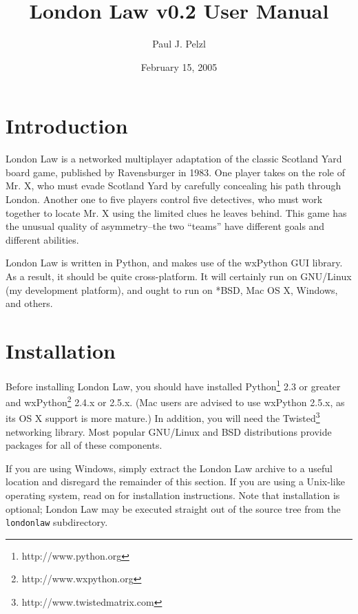 \documentclass[11pt,notitlepage]{article}
\begin{document}
\title{London Law v0.2 User Manual}
\author{Paul J. Pelzl}
\date{February 15, 2005}
\maketitle

\section*{Introduction}
London Law is a networked multiplayer adaptation of the classic Scotland Yard
board game, published by Ravensburger in 1983.  One player takes on the
role of Mr. X, who must evade Scotland Yard by carefully concealing his
path through London.  Another one to five players control five detectives,
who must work together to locate Mr. X using the limited clues he leaves
behind.  This game has the unusual quality of asymmetry--the two ``teams''
have different goals and different abilities.

London Law is written in Python, and makes use of the wxPython GUI library.
As a result, it should be quite cross-platform.  It will certainly run on
GNU/Linux (my development platform), and ought to run on *BSD, Mac OS X,
Windows, and others.

\section*{Installation}
Before installing London Law, you should have installed 
Python\footnote{http://www.python.org}
2.3 or greater and 
wxPython\footnote{http://www.wxpython.org}
2.4.x or 2.5.x.  (Mac users are advised to use wxPython 2.5.x, as its OS X support
is more mature.)  In addition, you will need the
Twisted\footnote{http://www.twistedmatrix.com}
networking library.  Most popular GNU/Linux and BSD distributions provide packages
for all of these components.

If you are using Windows, simply extract the London Law archive to a useful
location and disregard the remainder of this section.  If you are using a
Unix-like operating system, read on for installation instructions.  Note that
installation is optional; London Law may be executed straight out of the source tree from
the {\tt londonlaw} subdirectory.
\end{document}
